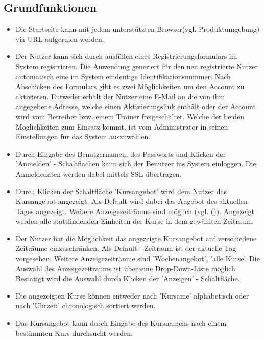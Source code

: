 \documentclass[a4paper]{scrreprt}
\begin{document}
\subsection{Grundfunktionen}
\begin{itemize}
	\item {}
	Die Startseite kann mit jedem unterstützten Browser(vgl. Produktumgebung) via URL aufgerufen werden.
	\item {}
	Der Nutzer kann sich durch ausfüllen eines Registrierungsformulars im System registrieren. Die Anwendung generiert für den neu registrierte Nutzer automatisch eine im System eindeutige Identifikationsnummer. Nach Abschicken des Formulars gibt es zwei Möglichkeiten um den Account zu aktivieren. Entweder erhält der Nutzer eine E-Mail an die von ihm angegebene Adresse, welche einen Aktivierungslink enthält oder der Account wird vom Betreiber bzw. einem Trainer freigeschaltet. Welche der beiden Möglichkeiten zum Einsatz kommt, ist vom Administrator in seinen Einstellungen für das System auszuwählen.
	\item {}
	Durch Eingabe des Benutzernamen, des Passworts und Klicken der 'Anmelden' - Schaltflächen kann sich der Benutzer ins System einloggen. Die Anmeldedaten werden dabei mittels SSL übertragen.
	\item {}
	Durch Klicken der Schaltfläche 'Kursangebot' wird dem Nutzer das Kursangebot angezeigt. Als Default wird dabei das Angebot des aktuellen Tages angezeigt. Weitere Anzeigezeiträume sind möglich (vgl. ()). Angezeigt werden alle stattfindenden Einheiten der Kurse in dem gewählten Zeitraum.
	\item {}
	Der Nutzer hat die Möglichkeit das angezeigte Kursangebot auf verschiedene Zeiträume einzuschränken. Als Default - Zeitraum ist der aktuelle Tag vorgesehen. Weitere Anzeigezeiträume sind 'Wochenangebot', 'alle Kurse'. Die Auswahl des Anzeigezeitraums ist über eine Drop-Down-Liste möglich. Bestätigt wird die Auswahl durch Klicken der 'Anzeigen' - Schaltfläche.
	\item {}
	Die angezeigten Kurse können entweder nach 'Kursame' alphabetisch oder nach 'Uhrzeit' chronologisch sortiert werden.
	\item {}
	Das Kursangebot kann durch Eingabe des Kursnamens nach einem bestimmten Kurs durchsucht werden.

\end{itemize}
\end{document}
